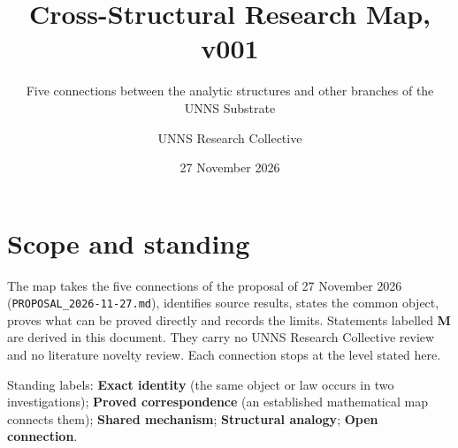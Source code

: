 \documentclass[
  11pt,
]{article}
\title{Cross-Structural Research Map, v001}
\subtitle{Five connections between the analytic structures and other
branches of the UNNS Substrate}
\author{UNNS Research Collective}
\date{27 November 2026}
\begin{document}
\maketitle

{
\setcounter{tocdepth}{1}
\tableofcontents
}
\hypertarget{scope-and-standing}{%
\section{Scope and standing}\label{scope-and-standing}}

The map takes the five connections of the proposal of 27 November 2026
(\texttt{PROPOSAL\_2026-11-27.md}), identifies source results, states
the common object, proves what can be proved directly and records the
limits. Statements labelled \textbf{M} are derived in this document.
They carry no UNNS Research Collective review and no literature novelty
review. Each connection stops at the level stated here.

Standing labels: \textbf{Exact identity} (the same object or law occurs
in two investigations); \textbf{Proved correspondence} (an established
mathematical map connects them); \textbf{Shared mechanism};
\textbf{Structural analogy}; \textbf{Open connection}.
\end{document}
